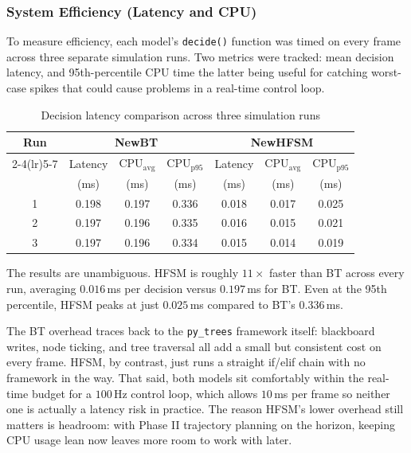 \documentclass[12pt, a4paper]{report}
\begin{document}
\subsubsection{System Efficiency (Latency and CPU)}

To measure efficiency, each model's \texttt{decide()} function was timed on every frame across three separate simulation runs. Two metrics were tracked: mean decision latency, and 95th-percentile CPU time the latter being useful for catching worst-case spikes that could cause problems in a real-time control loop.

\begin{table}[H]
\centering
\caption{Decision latency comparison across three simulation runs}
\label{tab:decide_latency}
\small
\setlength{\tabcolsep}{3.5pt}
\begin{tabular}{@{}ccccccc@{}}
\toprule
\textbf{Run} & \multicolumn{3}{c}{\textbf{NewBT}} & \multicolumn{3}{c}{\textbf{NewHFSM}} \\
\cmidrule(lr){2-4}\cmidrule(lr){5-7}
& Latency & CPU$_{\text{avg}}$ & CPU$_{\text{p95}}$ & Latency & CPU$_{\text{avg}}$ & CPU$_{\text{p95}}$ \\
& (ms) & (ms) & (ms) & (ms) & (ms) & (ms) \\
\midrule
1 & 0.198 & 0.197 & 0.336 & 0.018 & 0.017 & 0.025 \\
2 & 0.197 & 0.196 & 0.335 & 0.016 & 0.015 & 0.021 \\
3 & 0.197 & 0.196 & 0.334 & 0.015 & 0.014 & 0.019 \\
\bottomrule
\end{tabular}
\end{table}

The results are unambiguous. HFSM is roughly $11\times$ faster than BT across every run, averaging $0.016$\,ms per decision versus $0.197$\,ms for BT. Even at the 95th percentile, HFSM peaks at just $0.025$\,ms compared to BT's $0.336$\,ms.

The BT overhead traces back to the \texttt{py\_trees} framework itself: blackboard writes, node ticking, and tree traversal all add a small but consistent cost on every frame. HFSM, by contrast, just runs a straight if/elif chain with no framework in the way. That said, both models sit comfortably within the real-time budget for a $100\,\text{Hz}$ control loop, which allows $10$\,ms per frame so neither one is actually a latency risk in practice. The reason HFSM's lower overhead still matters is headroom: with Phase II trajectory planning on the horizon, keeping CPU usage lean now leaves more room to work with later.
\end{document}
